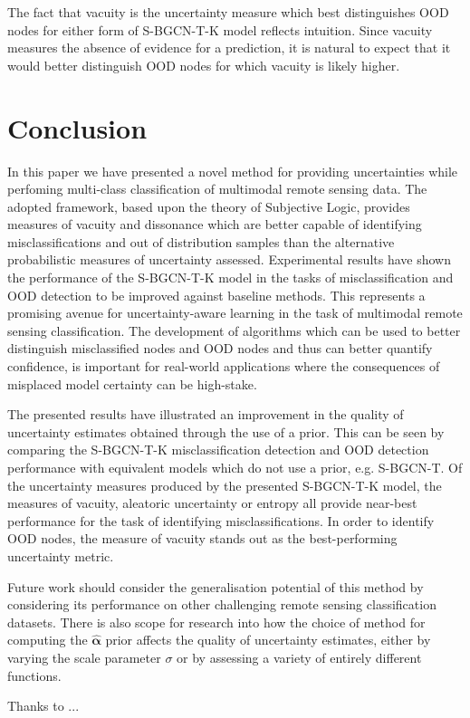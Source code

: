 \documentclass[
twocolumn,
]{ceurart}
\begin{document}
The fact that vacuity is the uncertainty measure which best distinguishes OOD nodes for either form of S-BGCN-T-K model reflects intuition.
Since vacuity measures the absence of evidence for a prediction, it is natural to expect that it would better distinguish OOD nodes for which vacuity is likely higher.

\section{Conclusion}
\label{sec::conclusion}

In this paper we have presented a novel method for providing uncertainties while perfoming multi-class classification of multimodal remote sensing data.
The adopted framework, based upon the theory of Subjective Logic, provides measures of vacuity and dissonance which are better capable of identifying misclassifications and out of distribution samples than the alternative probabilistic measures of uncertainty assessed.
Experimental results have shown the performance of the S-BGCN-T-K model in the tasks of misclassification and OOD detection to be improved against baseline methods.
This represents a promising avenue for uncertainty-aware learning in the task of multimodal remote sensing classification.
The development of algorithms which can be used to better distinguish misclassified nodes and OOD nodes and thus can better quantify confidence, is important for real-world applications where the consequences of misplaced model certainty can be high-stake.

The presented results have illustrated an improvement in the quality of uncertainty estimates obtained through the use of a prior.
This can be seen by comparing the S-BGCN-T-K misclassification detection and OOD detection performance with equivalent models which do not use a prior, e.g. S-BGCN-T.
Of the uncertainty measures produced by the presented S-BGCN-T-K model, the measures of vacuity, aleatoric uncertainty or entropy all provide near-best performance for the task of identifying misclassifications.
In order to identify OOD nodes, the measure of vacuity stands out as the best-performing   uncertainty metric.

Future work should consider the generalisation potential of this method by considering its performance on other challenging remote sensing classification datasets. There is also scope for research into how the choice of method for computing the $\hat{\boldsymbol{\alpha}}$ prior affects the quality of uncertainty estimates, either by varying the scale parameter $\sigma$ or by assessing a variety of entirely different functions.
\begin{acknowledgments}
  Thanks to ...
\end{acknowledgments}


\end{document}
